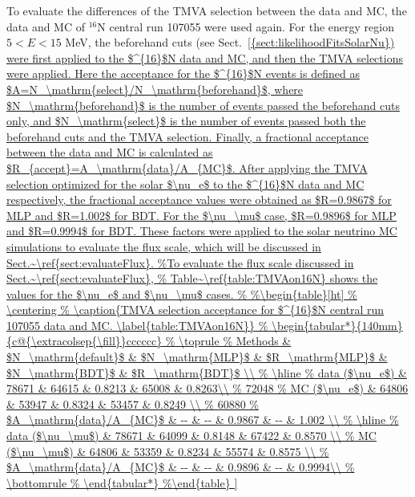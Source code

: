 To evaluate the differences of the TMVA selection between the data and MC, the data and MC of $^{16}$N central run 107055 were used again. For the energy region $5<E<15$ MeV, the beforehand cuts (see Sect.~\ref{{sect:likelihoodFitsSolarNu}) were first applied to the $^{16}$N data and MC, and then the TMVA selections were applied. Here the acceptance for the $^{16}$N events is defined as $A=N_\mathrm{select}/N_\mathrm{beforehand}$, where $N_\mathrm{beforehand}$ is the number of events passed the beforehand cuts only, and $N_\mathrm{select}$ is the number of events passed both the beforehand cuts and the TMVA selection. Finally, a fractional acceptance between the data and MC is calculated as $R_{accept}=A_\mathrm{data}/A_{MC}$. After applying the TMVA selection optimized for the solar $\nu_e$ to the $^{16}$N data and MC respectively, the fractional acceptance values were obtained as $R=0.9867$ for MLP and $R=1.002$ for BDT. For the $\nu_\mu$ case, $R=0.9896$ for MLP and $R=0.9994$ for BDT. These factors were applied to the solar neutrino MC simulations to evaluate the flux scale, which will be discussed in Sect.~\ref{sect:evaluateFlux}.

	
%



}
